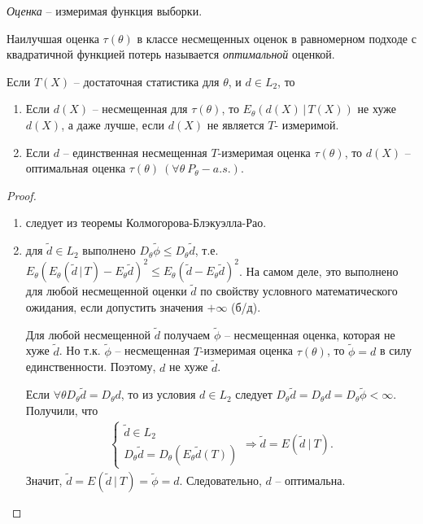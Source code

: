 \begin{definition}
    \textit{Оценка} -- измеримая функция выборки.
\end{definition}
\begin{definition}
    Наилучшая оценка $\tau(\theta)$ в классе несмещенных оценок в равномерном подходе с квадратичной функцией потерь называется \textit{оптимальной} оценкой.
\end{definition}
\begin{corollary}
    Если $T(X)$ -- достаточная статистика для $\theta$, и $d\in L_2$, то
    \begin{enumerate}
        \item Если $d(X)$ -- несмещенная для $\tau(\theta)$, то $E_\theta(d(X)\, \vert\, T(X))$ не хуже $d(X)$, а даже лучше, если $d(X)$ не является $T$- измеримой.
        \item Если $d$ -- единственная несмещенная $T$-измеримая оценка $\tau(\theta)$, то $d(X)$ -- оптимальная оценка $\tau(\theta)\ (\forall \theta\ P_\theta-a.s.)$.
    \end{enumerate}
\end{corollary}
\begin{proof} ~
    \begin{enumerate}
        \item следует из теоремы Колмогорова-Блэкуэлла-Рао.
        \item для $\widetilde{d} \in L_2$ выполнено $D_\theta\widetilde{\phi} \leq D_\theta\widetilde{d}$, т.е. $E_\theta\left(E_\theta\left(\widetilde{d}\, \vert\, T\right) - E_\theta\widetilde{d}\right)^2 \leq E_\theta\left(\widetilde{d} - E_\theta\widetilde{d}\right)^2$. На самом деле, это выполнено для любой несмещенной оценки $\widetilde{d}$ по свойству условного математического ожидания, если допустить значения $+\infty$ (б/д).
        
        Для любой несмещенной $\widetilde{d}$ получаем $\widetilde{\phi}$ -- несмещенная оценка, которая не хуже $\widetilde{d}$. Но т.к. $\widetilde{\phi}$ -- несмещенная $T$-измеримая оценка $\tau(\theta)$, то $\widetilde{\phi} = d$ в силу единственности. Поэтому, $d$ не хуже $\widetilde{d}$.
        
        Если $\forall \theta D_\theta\widetilde{d} = D_\theta d$, то из условия $d \in L_2$ следует $D_\theta\widetilde{d} = D_\theta d = D_\theta\widetilde{\phi} < \infty$. Получили, что
        \begin{gather*}
            \begin{cases}
                \tilde{d} \in L_{2}\\
                D_{\theta }\tilde{d} =D_{\theta }\left( E_{\theta }\tilde{d}( T)\right)
            \end{cases} \Rightarrow \tilde{d} =E\left(\tilde{d} \ |\ T\right).
        \end{gather*}
        Значит, $\displaystyle \tilde{d} =E\left(\tilde{d} \ |\ T\right) =\tilde{\phi } =d$. Следовательно, $\displaystyle d$ -- оптимальна.
    \end{enumerate}
\end{proof}
    